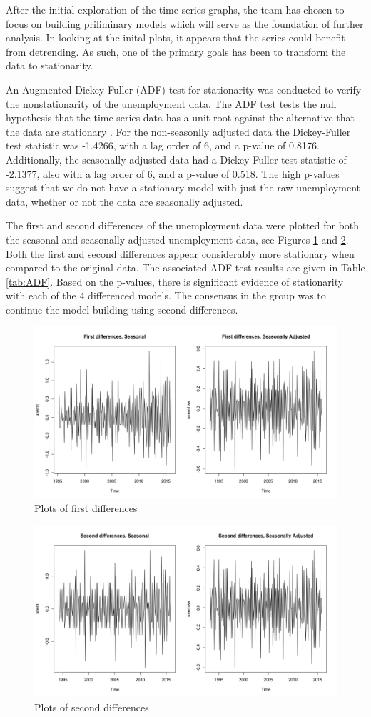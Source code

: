 \documentclass[twoside,twocolumn]{article}
\begin{document}
			After the initial exploration of the time series graphs, the team has chosen to focus on building priliminary models which will serve as the foundation of further analysis. In looking at the inital plots, it appears that the series could benefit from detrending. As such, one of the primary goals has been to transform the data to stationarity. 
			
			An Augmented Dickey-Fuller (ADF) test for stationarity was conducted to verify the nonstationarity of the unemployment data.  The ADF test tests the null hypothesis that the time series data has a unit root against the alternative that the data are stationary \citep{Shumway2006}. For the non-seasonlly adjusted data the Dickey-Fuller test statistic was -1.4266, with a lag order of 6, and a p-value of 0.8176. Additionally, the seasonally adjusted data had a Dickey-Fuller test statistic of -2.1377, also with a lag order of 6, and a p-value of 0.518. The high p-values suggest that we do not have a stationary model with just the raw unemployment data, whether or not the data are seasonally adjusted.
			
		 The first and second differences of the unemployment data were plotted for both the seasonal and seasonally adjusted unemployment data, see Figures \ref{fig:firstdiff} and \ref{fig:secdiff}. Both the first and second differences appear considerably more stationary when compared to the original data. The associated ADF test results are given in Table \ref{tab:ADF}. Based on the p-values, there is significant evidence of stationarity with each of the 4 differenced models. The consensus in the group was to continue the model building using second differences.
		 
	
		 \begin{figure}[H]
							\centering
							\includegraphics[width=.6\linewidth]{images/firstdiff}
							\caption{Plots of first differences}
							\label{fig:firstdiff}
						\end{figure}
						
								 \begin{figure}[H]
							\centering
							\includegraphics[width=.6\linewidth]{images/secdiff}
							\caption{Plots of second differences}
							\label{fig:secdiff}
						\end{figure}
\end{document}
